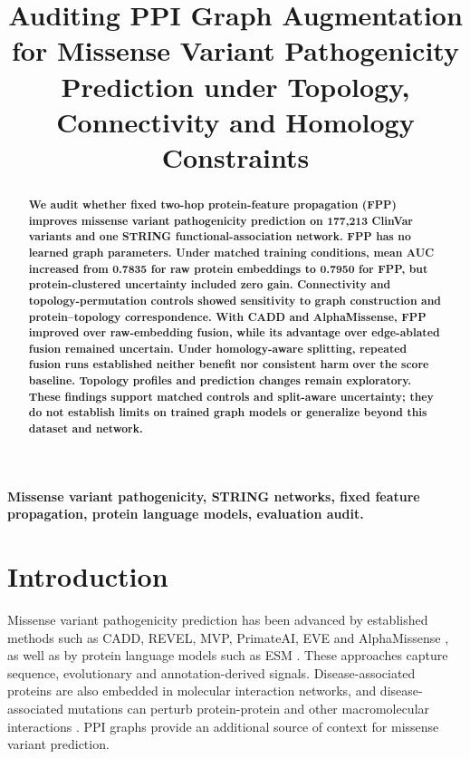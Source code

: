 \documentclass[conference]{IEEEtran}
\title{Auditing PPI Graph Augmentation for Missense Variant Pathogenicity Prediction under Topology, Connectivity and Homology Constraints}
\author{}
\begin{document}
\maketitle


\begin{abstract}
\bfseries\boldmath
We audit whether fixed two-hop protein-feature propagation (FPP) improves missense variant pathogenicity prediction on 177,213 ClinVar variants and one STRING functional-association network. FPP has no learned graph parameters. Under matched training conditions, mean AUC increased from 0.7835 for raw protein embeddings to 0.7950 for FPP, but protein-clustered uncertainty included zero gain. Connectivity and topology-permutation controls showed sensitivity to graph construction and protein--topology correspondence. With CADD and AlphaMissense, FPP improved over raw-embedding fusion, while its advantage over edge-ablated fusion remained uncertain. Under homology-aware splitting, repeated fusion runs established neither benefit nor consistent harm over the score baseline. Topology profiles and prediction changes remain exploratory. These findings support matched controls and split-aware uncertainty; they do not establish limits on trained graph models or generalize beyond this dataset and network.

\end{abstract}

\begin{IEEEkeywords}
\bfseries\boldmath
Missense variant pathogenicity, STRING networks, fixed feature propagation, protein language models, evaluation audit.
\end{IEEEkeywords}

\section{Introduction}

Missense variant pathogenicity prediction has been advanced by established methods such as CADD, REVEL, MVP, PrimateAI, EVE and AlphaMissense \cite{Kircher2014CADD,Ioannidis2016REVEL,Qi2021MVP,Sundaram2018PrimateAI,Frazer2021EVE,Cheng2023AlphaMissense}, as well as by protein language models such as ESM \cite{Lin2023ESM}. These approaches capture sequence, evolutionary and annotation-derived signals. Disease-associated proteins are also embedded in molecular interaction networks, and disease-associated mutations can perturb protein-protein and other macromolecular interactions \cite{Barabasi2011NetworkMedicine,Menche2015DiseaseModules,Sahni2015InteractionPerturbation,Chen2018InteractomePerturbation}. PPI graphs provide an additional source of context for missense variant prediction.
\end{document}
